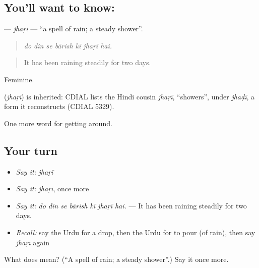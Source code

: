 \subsection*{You'll want to know: }
\textbf{} — \emph{jhaṛī} — \textquotedblleft{}a spell of rain; a steady shower\textquotedblright{}.

\begin{quote}
      
\end{quote}

\begin{quote}
\emph{do din se bārish kī jhaṛī hai.}
\end{quote}

\begin{quote}
It has been raining steadily for two days.
\end{quote}

Feminine.

\begin{cousinweb}
\textbf{} (\emph{jhaṛī}) is inherited: CDIAL lists the Hindi cousin \emph{jhaṛī}, \textquotedblleft{}showers\textquotedblright{}, under \emph{jhaḍī}, a form it reconstructs (CDIAL 5329).
\end{cousinweb}

\begin{grammarlens}[title={What you've built}]
One more word for getting around.
\end{grammarlens}

\subsection*{Your turn}
\begin{itemize}
\raggedright
  \item \emph{Say it:} \emph{jhaṛī}
  \item \emph{Say it:} \emph{jhaṛī}, once more
  \item \emph{Say it:} \emph{do din se bārish kī jhaṛī hai.} — It has been raining steadily for two days.
  \item \emph{Recall:} say the Urdu for a drop, then the Urdu for to pour (of rain), then say \emph{jhaṛī} again
\end{itemize}

\begin{tcolorbox}[breakable,colback=teal!4,colframe=teal!35!black,title={Before you move on}]
What does  mean? (\textquotedblleft{}A spell of rain; a steady shower\textquotedblright{}.) Say it once more.
\end{tcolorbox}
